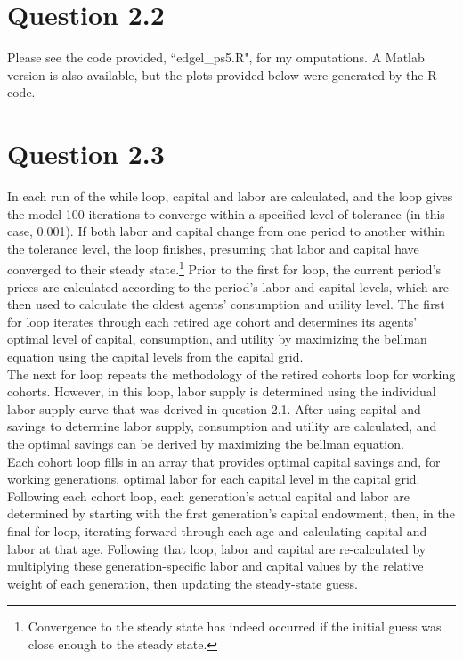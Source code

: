 \documentclass{article}
\begin{document}

\section*{Question 2.2}

Please see the code provided, ``edgel\_ps5.R", for my omputations. A Matlab version is also available, but the plots provided below were generated by the R code.


\section*{Question 2.3}

In each run of the while loop, capital and labor are calculated, and the loop gives the model 100 iterations to converge within a specified level of tolerance (in this case, 0.001). If both labor and capital change from one period to another within the tolerance level, the loop finishes, presuming that labor and capital have converged to their steady state.\footnote{Convergence to the steady state has indeed occurred if the initial guess was close enough to the steady state.} Prior to the first for loop, the current period's prices are calculated according to the period's labor and capital levels, which are then used to calculate the oldest agents' consumption and utility level. The first for loop iterates through each retired age cohort and determines its agents' optimal level of capital, consumption, and utility by maximizing the bellman equation using the capital levels from the capital grid. \\

The next for loop repeats the methodology of the retired cohorts loop for working cohorts. However, in this loop, labor supply is determined using the individual labor supply curve that was derived in question 2.1. After using capital and savings to determine labor supply, consumption and utility are calculated, and the optimal savings can be derived by maximizing the bellman equation. \\

Each cohort loop fills in an array that provides optimal capital savings and, for working generations, optimal labor for each capital level in the capital grid. Following each cohort loop, each generation's actual capital and labor are determined by starting with the first generation's capital endowment, then, in the final for loop, iterating forward through each age and calculating capital and labor at that age. Following that loop, labor and capital are re-calculated by multiplying these generation-specific labor and capital values by the relative weight of each generation, then updating the steady-state guess.
\end{document}

